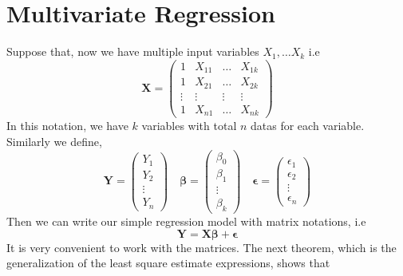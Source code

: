 \section{Multivariate Regression}
Suppose that, now we have multiple input variables $X_1, \ldots X_k$ i.e 
\[\boldsymbol{X} = 
    \begin{pmatrix}
        1 &X_{11} &\ldots &X_{1k} \\
        1 &X_{21} &\ldots &X_{2k} \\
        \vdots &\vdots &\vdots &\vdots \\
        1 &X_{n1} &\ldots &X_{nk}
    \end{pmatrix}\]
    In this notation, we have $k$ variables with total $n$ datas for each variable. Similarly we define,
    \[
        \boldsymbol{Y} =
        \begin{pmatrix}
            Y_1 \\
            Y_2 \\
            \vdots \\
            Y_n
        \end{pmatrix}
        \quad 
        \boldsymbol{\beta} = 
        \begin{pmatrix}
            \beta_0 \\
            \beta_1 \\
            \vdots \\
            \beta_k
        \end{pmatrix}
        \quad
        \boldsymbol{\epsilon} = 
        \begin{pmatrix}
            \epsilon_1 \\
            \epsilon_2 \\
            \vdots \\
            \epsilon_n
        \end{pmatrix}
    \]
    Then we can write our simple regression model with matrix notations, i.e
    \[\mathbf{Y} = \boldsymbol{ X\beta} + \boldsymbol{\epsilon} \]
    It is very convenient to work with the matrices. The next theorem, which is the generalization of the least square estimate expressions, shows that
